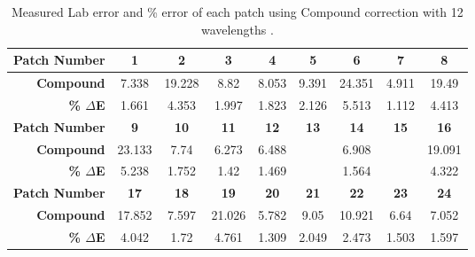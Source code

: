 \begin{table}[H]
  \caption{Measured Lab error and \% error of each patch using Compound correction with 12 wavelengths .}\n  \begin{center}
    \begin{tabularx}{\textwidth}{r c c c c c c c c}
    \toprule
        \textbf{Patch Number} & \textbf{1} & \textbf{2} & \textbf{3} & \textbf{4} & \textbf{5} & \textbf{6} & \textbf{7} & \textbf{8}\\ \midrule 
        \textbf{Compound} &7.338 &19.228 &8.82 &8.053 &9.391 &24.351 &4.911 &19.49\\ 
        \textbf{\textbf{\% $\Delta$E}} &1.661 &4.353 &1.997 &1.823 &2.126 &5.513 &1.112 &4.413\\ \midrule 
        \textbf{Patch Number} & \textbf{9} & \textbf{10} & \textbf{11} & \textbf{12} & \textbf{13} & \textbf{14} & \textbf{15} & \textbf{16}\\ \midrule 
        \textbf{Compound} &23.133 &7.74 &6.273 &6.488 &\cellcolor{colorgreen}{4.607} &6.908 &\cellcolor{colorred}{29.981} &19.091\\ 
        \textbf{\textbf{\% $\Delta$E}} &5.238 &1.752 &1.42 &1.469 &\cellcolor{colorgreen}{1.043} &1.564 &\cellcolor{colorred}{6.788} &4.322\\ \midrule 
        \textbf{Patch Number} & \textbf{17} & \textbf{18} & \textbf{19} & \textbf{20} & \textbf{21} & \textbf{22} & \textbf{23} & \textbf{24}\\ \midrule 
        \textbf{Compound} &17.852 &7.597 &21.026 &5.782 &9.05 &10.921 &6.64 &7.052\\ 
        \textbf{\textbf{\% $\Delta$E}} &4.042 &1.72 &4.761 &1.309 &2.049 &2.473 &1.503 &1.597\\ \midrule 
    \bottomrule
    \end{tabularx}
  \end{center}
\end{table}
